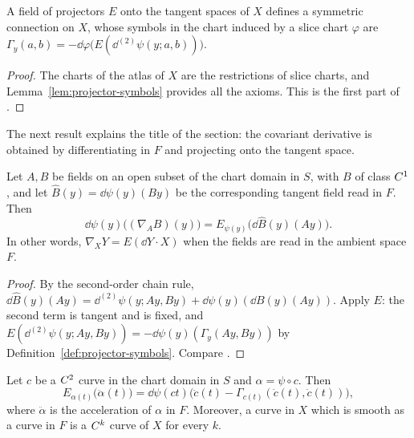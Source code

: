\begin{theorem}
  \label{thm:projector-connection}
  \leanok
  A field of projectors $E$ onto the tangent spaces of $X$ defines a symmetric connection on $X$,
  whose symbols in the chart induced by a slice chart $\varphi$ are
  $\Gamma_y(a, b) = -\dd\varphi\bigl(E(\dd^{(2)}\psi(y; a, b))\bigr)$.
\end{theorem}

\begin{proof}
  \leanok
  The charts of the atlas of $X$ are the restrictions of slice charts, and
  Lemma~\ref{lem:projector-symbols} provides all the axioms. This is the first part of
  \cite[Teorema~6.6.1]{Lar22}.
\end{proof}

The next result explains the title of the section: the covariant derivative is obtained by
differentiating in $F$ and projecting onto the tangent space.

\begin{theorem}
  \label{thm:projector-derive-project}
  \leanok
  Let $A, B$ be fields on an open subset of the chart domain in $S$, with $B$ of class $C^{1}$,
  and let $\hat B(y) = \dd\psi(y)(B y)$ be the corresponding tangent field read in $F$. Then
  \[
    \dd\psi(y)\bigl((\nabla_A B)(y)\bigr) = E_{\psi(y)}\bigl(\dd\hat B(y)(A y)\bigr).
  \]
  In other words, $\nabla_X Y = E(\dd Y \cdot X)$ when the fields are read in the ambient
  space $F$.
\end{theorem}

\begin{proof}
  \leanok
  By the second-order chain rule,
  $\dd\hat B(y)(A y) = \dd^{(2)}\psi(y; A y, B y) + \dd\psi(y)(\dd B(y)(A y))$. Apply $E$: the
  second term is tangent and is fixed, and $E(\dd^{(2)}\psi(y; A y, B y))
  = -\dd\psi(y)(\Gamma_y(A y, B y))$ by Definition~\ref{def:projector-symbols}. Compare
  \cite[\S6.6]{Lar22}.
\end{proof}

\begin{lemma}
  \label{lem:projector-accel}
  \leanok
  Let $c$ be a $C^{2}$ curve in the chart domain in $S$ and $\alpha = \psi \circ c$. Then
  \[
    E_{\alpha(t)}\bigl(\ddot\alpha(t)\bigr)
      = \dd\psi(c t)\bigl(\ddot c(t) - \Gamma_{c(t)}(\dot c(t), \dot c(t))\bigr),
  \]
  where $\ddot\alpha$ is the acceleration of $\alpha$ in $F$. Moreover, a curve in $X$ which is
  smooth as a curve in $F$ is a $C^{k}$ curve of $X$ for every $k$.
\end{lemma}

